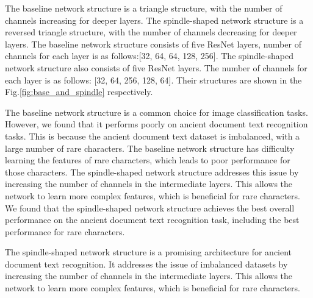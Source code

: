 The baseline network structure is a triangle structure, with the number of channels increasing for deeper layers. The spindle-shaped network structure is a reversed triangle structure, with the number of channels decreasing for deeper layers. 
The baseline network structure consists of five ResNet layers, number of channels for each layer is as follows:[32, 64, 64, 128, 256].
The spindle-shaped network structure also consists of five ResNet layers. The number of channels for each layer is as follows: [32, 64, 256, 128, 64]. Their structures are shown in the Fig.\ref{fig:base_and_spindle} respectively.

The baseline network structure is a common choice for image classification tasks. However, we found that it performs poorly on ancient document text recognition tasks. This is because the ancient document text dataset is imbalanced, with a large number of rare characters. The baseline network structure has difficulty learning the features of rare characters, which leads to poor performance for those characters. The spindle-shaped network structure addresses this issue by increasing the number of channels in the intermediate layers. This allows the network to learn more complex features, which is beneficial for rare characters. We found that the spindle-shaped network structure achieves the best overall performance on the ancient document text recognition task, including the best performance for rare characters.

The spindle-shaped network structure is a promising architecture for ancient document text recognition. It addresses the issue of imbalanced datasets by increasing the number of channels in the intermediate layers. This allows the network to learn more complex features, which is beneficial for rare characters.
